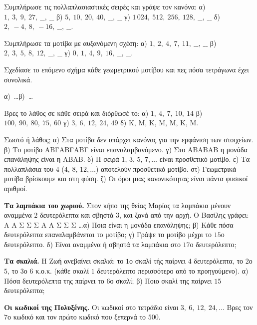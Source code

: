 \ex Συμπλήρωσε τις πολλαπλασιαστικές σειρές και γράψε τον κανόνα: α) $1,\ 3,\ 9,\ 27,\ \_\_,\ \_\_$ \quad β) $5,\ 10,\ 20,\ 40,\ \_\_,\ \_\_$ \quad γ) $1\,024,\ 512,\ 256,\ 128,\ \_\_,\ \_\_$ \quad δ) $2,\ -4,\ 8,\ -16,\ \_\_,\ \_\_$.

\ex Συμπλήρωσε τα μοτίβα με αυξανόμενη σχέση: α) $1,\ 2,\ 4,\ 7,\ 11,\ \_\_,\ \_\_$ \quad β) $2,\ 3,\ 5,\ 8,\ 12,\ \_\_,\ \_\_$ \quad γ) $0,\ 1,\ 4,\ 9,\ 16,\ \_\_,\ \_\_$.

\ex Σχεδίασε το επόμενο σχήμα κάθε γεωμετρικού μοτίβου και πες πόσα τετράγωνα έχει συνολικά.
\begin{center}
α)\ \quad{}\quad{}\quad\ldots\hspace{3em}β)\ \quad{}\quad{}\quad\ldots
\end{center}

\ex Βρες το λάθος σε κάθε σειρά και διόρθωσέ το: α) $1,\ 4,\ 7,\ 10,\ 14$ \quad β) $100,\ 90,\ 80,\ 75,\ 60$ \quad γ) $3,\ 6,\ 12,\ 24,\ 49$ \quad δ) Κ, Μ, Κ, Μ, Μ, Κ, Μ.

\ex Σωστό ή λάθος; α) Στα μοτίβα δεν υπάρχει κανόνας για την εμφάνιση των στοιχείων. \quad β) Το μοτίβο ΑΒΓΑΒΓΑΒΓ είναι επαναλαμβανόμενο. \quad γ) Στο ΑΒΑΒΑΒ η μονάδα επανάληψης είναι η ΑΒΑΒ. \quad δ) Η σειρά $1,\,3,\,5,\,7,\dots$ είναι προσθετικό μοτίβο. \quad ε) Τα πολλαπλάσια του $4$ ($4,\,8,\,12,\dots$) αποτελούν προσθετικό μοτίβο. \quad στ) Γεωμετρικά μοτίβα βρίσκουμε και στη φύση. \quad ζ) Οι όροι μιας κανονικότητας είναι πάντα φυσικοί αριθμοί.


\ex \textbf{Τα λαμπάκια του χωριού.} Στον κήπο της θείας Μαρίας τα λαμπάκια μένουν αναμμένα $2$ δευτερόλεπτα και σβηστά $3$, και ξανά από την αρχή. Ο Βασίλης γράφει: Α Α Σ Σ Σ Α Α Σ Σ Σ \ldots α) Ποια είναι η μονάδα επανάληψης; β) Κάθε πόσα δευτερόλεπτα επαναλαμβάνεται το μοτίβο; γ) Γράψε το μοτίβο μέχρι το $15$ο δευτερόλεπτο. δ) Είναι αναμμένα ή σβηστά τα λαμπάκια στο $17$ο δευτερόλεπτο;

\ex \textbf{Τα σκαλιά.} Η Ζωή ανεβαίνει σκαλιά: το $1$ο σκαλί τής παίρνει $4$ δευτερόλεπτα, το $2$ο $5$, το $3$ο $6$ κ.ο.κ. (κάθε σκαλί $1$ δευτερόλεπτο περισσότερο από το προηγούμενο). α) Πόσα δευτερόλεπτα της παίρνει το $6$ο σκαλί; β) Ποιο σκαλί της παίρνει $15$ δευτερόλεπτα;

\ex \textbf{Οι κωδικοί της Πολυξένης.} Οι κωδικοί στο τετράδιο είναι $3,\ 6,\ 12,\ 24,\dots$ Βρες τον $7$ο κωδικό και τον πρώτο κωδικό που ξεπερνά το $500$.

